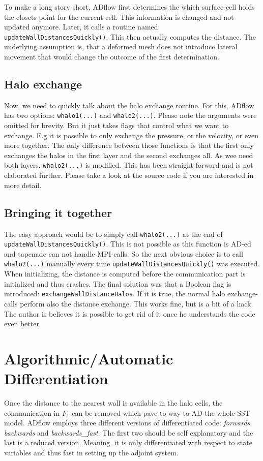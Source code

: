 To make a long story short, ADflow first determines the which surface cell
holds the closets point for the current cell. This information is changed and
not updated anymore. Later, it calls a routine named
\texttt{updateWallDistancesQuickly()}. This then actually computes the distance.
The underlying assumption is, that a deformed mesh does not introduce lateral
movement that would change the outcome of the first determination. 




\subsection{Halo exchange}
Now, we need to quickly talk about the halo exchange routine. For this, ADflow
has two options: \texttt{whalo1(...)} and \texttt{whalo2(...)}. Please note the
arguments were omitted for brevity. But it just takes flags that control what
we want to exchange. E.g it is possible to only exchange the pressure, or the
velocity, or even more together. The only difference between those functions is
that the first only exchanges the halos in the first layer and the second
exchanges all. As wee need both layers, \texttt{whalo2(...)} is modified. This
has been straight forward and is not elaborated further. Please take  a look at
the source code if you are interested in more detail.



\subsection{Bringing it together}
The easy approach would be to simply call \texttt{whalo2(...)} at the end of
\texttt{updateWallDistancesQuickly()}. This is not possible as this function is
AD-ed and tapenade can not handle MPI-calls. So the next obvious choice is to
call \texttt{whalo2(...)} manually every time
\texttt{updateWallDistancesQuickly()} was executed. When initializing, the
distance is computed before the communication part is initialized and thus
crashes. The final solution was that a Boolean flag is introduced:
\texttt{exchangeWallDistanceHalos}. If it is true, the normal halo
exchange-calls perform also the distance exchange. This works fine, but is a bit
of a hack. The author is believes it is possible to get rid of it once he
understands the code even better.








\section{Algorithmic/Automatic Differentiation}
Once the distance to the nearest wall is available in the halo cells, the
communication in $F_1$ can be removed which pave to way to AD the whole SST
model. ADflow employs three different versions of differentiated code:
\textit{forwards}, \textit{backwards} and \textit{backwards\_fast}. The first
two should be self explanatory and the last is a reduced version. Meaning, it
is only differentiated with respect to state variables and thus fast in setting
up the adjoint system.




